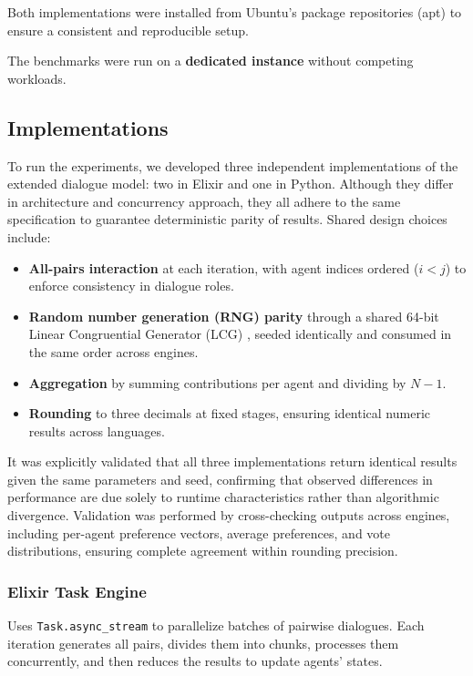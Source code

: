 \documentclass[
]{ceurart}
\begin{document}
Both implementations were installed from Ubuntu’s package repositories (apt) to ensure a consistent and reproducible setup.


The benchmarks were run on a \textbf{dedicated instance} without competing workloads.

\subsection{Implementations}
To run the experiments, we developed three independent implementations of the extended dialogue model: two in Elixir and one in Python. Although they differ in architecture and concurrency approach, they all adhere to the same specification to guarantee deterministic parity of results. Shared design choices include:

\begin{itemize}
	\item \textbf{All-pairs interaction} at each iteration, with agent indices ordered ($i < j$) to enforce consistency in dialogue roles.
	\item \textbf{Random number generation (RNG) parity} through a shared 64-bit Linear Congruential Generator (LCG) \cite{Thomson1958}, seeded identically and consumed in the same order across engines.
	\item \textbf{Aggregation} by summing contributions per agent and dividing by $N-1$.
	\item \textbf{Rounding} to three decimals at fixed stages, ensuring identical numeric results across languages.
\end{itemize}

It was explicitly validated that all three implementations return identical results given the same parameters and seed, confirming that observed differences in performance are due solely to runtime characteristics rather than algorithmic divergence. Validation was performed by cross-checking outputs across engines, including per-agent preference vectors, average preferences, and vote distributions, ensuring complete agreement within rounding precision.

\subsubsection{Elixir Task Engine}
Uses \verb|Task.async_stream| to parallelize batches of pairwise dialogues. Each iteration generates all pairs, divides them into chunks, processes them concurrently, and then reduces the results to update agents’ states.
\end{document}
